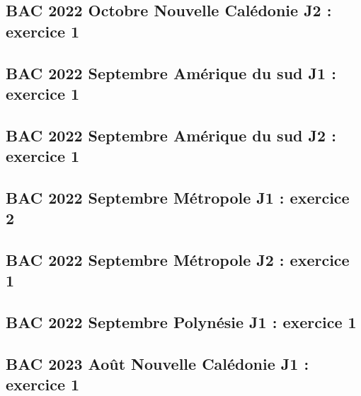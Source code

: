 \documentclass[lang=fr,edition=teacher,layout=sheet]{mxbook}
\begin{document}
\begingroup\endgroup
\par\bigskip
{}\subsection*{BAC 2022 Octobre Nouvelle Calédonie J2 : exercice 1}
\begingroup\endgroup
\par\bigskip
{}\subsection*{BAC 2022 Septembre Amérique du sud J1 : exercice 1}
\begingroup\endgroup
\par\bigskip
{}\subsection*{BAC 2022 Septembre Amérique du sud J2 : exercice 1}
\begingroup\endgroup
\par\bigskip
{}\subsection*{BAC 2022 Septembre Métropole J1 : exercice 2}
\begingroup\endgroup
\par\bigskip
{}\subsection*{BAC 2022 Septembre Métropole J2 : exercice 1}
\begingroup\endgroup
\par\bigskip
{}\subsection*{BAC 2022 Septembre Polynésie J1 : exercice 1}
\begingroup\endgroup
\par\bigskip
{}\subsection*{BAC 2023 Août Nouvelle Calédonie J1 : exercice 1}
\end{document}
